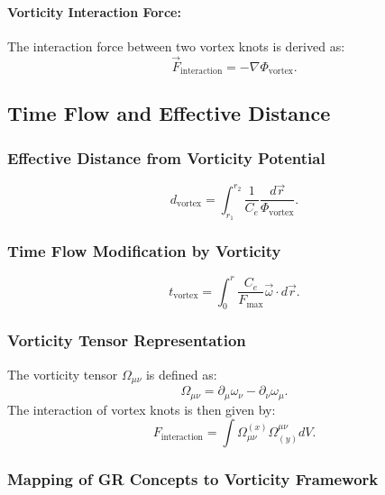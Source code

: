     \paragraph*{Vorticity Interaction Force:}
    The interaction force between two vortex knots is derived as:
    \begin{equation}
        \vec{F}_{\text{interaction}} = -\nabla \Phi_{\text{vortex}}.
    \end{equation}

    \subsection*{Time Flow and Effective Distance}

    \subsubsection*{Effective Distance from Vorticity Potential}
    \begin{equation}
        d_{\text{vortex}} = \int_{r_1}^{r_2} \frac{1}{C_e} \frac{d\vec{r}}{\Phi_{\text{vortex}}}.
    \end{equation}

    \subsubsection*{Time Flow Modification by Vorticity}
    \begin{equation}
        t_{\text{vortex}} = \int_0^r \frac{C_e}{F_{\text{max}}} \vec{\omega} \cdot d\vec{r}.
    \end{equation}

    \subsubsection*{Vorticity Tensor Representation}
    The vorticity tensor $\Omega_{\mu \nu}$ is defined as:
    \begin{equation}
        \Omega_{\mu \nu} = \partial_\mu \omega_\nu - \partial_\nu \omega_\mu.
    \end{equation}
    The interaction of vortex knots is then given by:
    \begin{equation}
        F_{\text{interaction}} = \int \Omega_{\mu \nu}^{(x)} \Omega^{\mu \nu}_{(y)} dV.
    \end{equation}

    \subsubsection*{Mapping of GR Concepts to Vorticity Framework}


